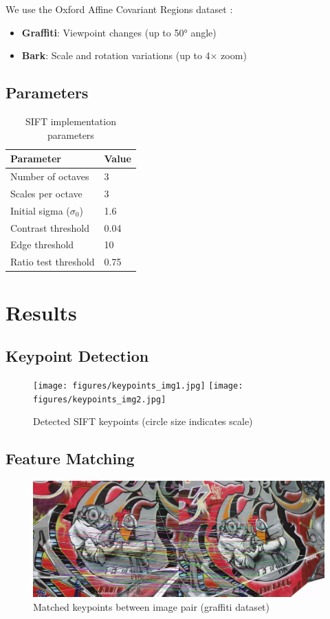 \documentclass[11pt, a4paper]{article}
\begin{document}
We use the Oxford Affine Covariant Regions dataset \cite{oxford-dataset}:
\begin{itemize}
    \item \textbf{Graffiti}: Viewpoint changes (up to 50° angle)
    \item \textbf{Bark}: Scale and rotation variations (up to 4× zoom)
\end{itemize}

\subsection{Parameters}

\begin{table}[h]
\centering
\begin{tabular}{ll}
\toprule
Parameter & Value \\
\midrule
Number of octaves & 3 \\
Scales per octave & 3 \\
Initial sigma ($\sigma_0$) & 1.6 \\
Contrast threshold & 0.04 \\
Edge threshold & 10 \\
Ratio test threshold & 0.75 \\
\bottomrule
\end{tabular}
\caption{SIFT implementation parameters}
\end{table}

\section{Results}

\subsection{Keypoint Detection}

\begin{figure}[h]
\centering
\texttt{[image: figures/keypoints\_img1.jpg]}
\texttt{[image: figures/keypoints\_img2.jpg]}
\caption{Detected SIFT keypoints (circle size indicates scale)}
\end{figure}

\subsection{Feature Matching}

\begin{figure}[h]
\centering
\includegraphics[width=\textwidth]{figures/graffiti_matches.jpg}
\caption{Matched keypoints between image pair (graffiti dataset)}
\end{figure}
\end{document}
